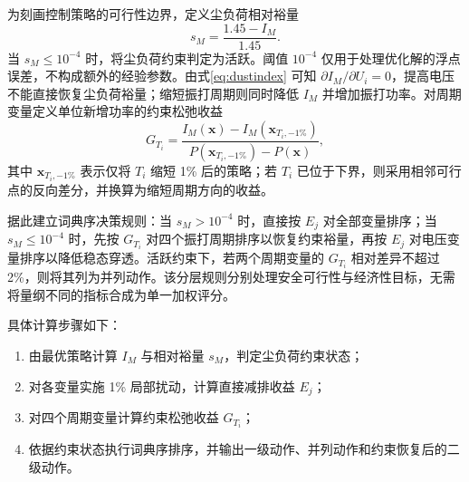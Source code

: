 为刻画控制策略的可行性边界，定义尘负荷相对裕量
\begin{equation}
s_M=\frac{1.45-I_M}{1.45}.
\label{eq:dustslack}
\end{equation}
当 $s_M\le10^{-4}$ 时，将尘负荷约束判定为活跃。阈值 $10^{-4}$ 仅用于处理优化解的浮点误差，不构成额外的经验参数。由式\eqref{eq:dustindex} 可知 $\partial I_M/\partial U_i=0$，提高电压不能直接恢复尘负荷裕量；缩短振打周期则同时降低 $I_M$ 并增加振打功率。对周期变量定义单位新增功率的约束松弛收益
\begin{equation}
G_{T_i}=
\frac{I_M(\bm x)-I_M(\bm x_{T_i,-1\%})}
{P(\bm x_{T_i,-1\%})-P(\bm x)},
\label{eq:relief}
\end{equation}
其中 $\bm x_{T_i,-1\%}$ 表示仅将 $T_i$ 缩短 1\% 后的策略；若 $T_i$ 已位于下界，则采用相邻可行点的反向差分，并换算为缩短周期方向的收益。

据此建立词典序决策规则：当 $s_M>10^{-4}$ 时，直接按 $E_j$ 对全部变量排序；当 $s_M\le10^{-4}$ 时，先按 $G_{T_i}$ 对四个振打周期排序以恢复约束裕量，再按 $E_j$ 对电压变量排序以降低稳态穿透。活跃约束下，若两个周期变量的 $G_{T_i}$ 相对差异不超过 2\%，则将其列为并列动作。该分层规则分别处理安全可行性与经济性目标，无需将量纲不同的指标合成为单一加权评分。

具体计算步骤如下：
\begin{enumerate}
  \item 由最优策略计算 $I_M$ 与相对裕量 $s_M$，判定尘负荷约束状态；
  \item 对各变量实施 1\% 局部扰动，计算直接减排收益 $E_j$；
  \item 对四个周期变量计算约束松弛收益 $G_{T_i}$；
  \item 依据约束状态执行词典序排序，并输出一级动作、并列动作和约束恢复后的二级动作。
\end{enumerate}
